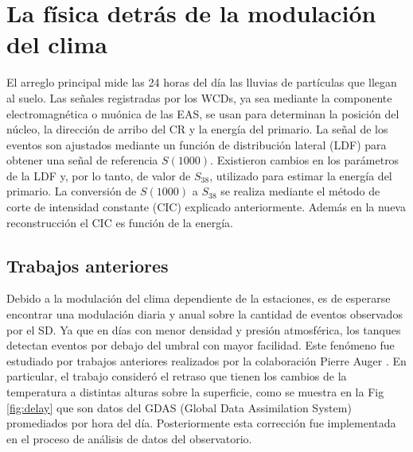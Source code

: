 

\section{La física detrás de la modulación del clima}\label{seccion:fisica_clima}

El arreglo principal mide las 24 horas del día las lluvias de partículas que llegan al suelo. Las señales registradas por los WCDs, ya sea mediante la componente electromagnética o muónica de las EAS, se usan para determinan la posición del núcleo, la dirección de arribo del CR y la energía del primario. La señal de los eventos son ajustados mediante un función de distribución lateral (LDF) para obtener una señal de referencia $S(1000)$. Existieron cambios en los parámetros de la LDF y, por lo tanto, de valor de $S_{38}$, utilizado para estimar la energía del primario. La conversión de $S(1000)$ a $S_{38}$ se realiza mediante el método de corte de intensidad constante (CIC) explicado anteriormente. Además en la nueva reconstrucción el CIC es función de la energía.

\subsection{Trabajos anteriores}

Debido a la modulación del clima dependiente de la estaciones, es de esperarse encontrar una modulación diaria y anual sobre la cantidad de eventos observados por el SD. Ya que en días con menor densidad y presión atmosférica, los tanques detectan eventos por debajo del umbral con mayor facilidad. Este fenómeno fue estudiado por trabajos anteriores realizados por la colaboración Pierre Auger \cite{aab2017impact} \cite{collaboration2009atmospheric}. En particular, el trabajo \cite{aab2017impact} consideró el retraso que tienen los cambios de  la temperatura a distintas alturas sobre la superficie, como se muestra en la Fig\,\ref{fig:delay} que son datos del GDAS (Global Data Assimilation System) promediados por hora del día. Posteriormente esta corrección fue implementada en el proceso  de análisis de datos del observatorio.


